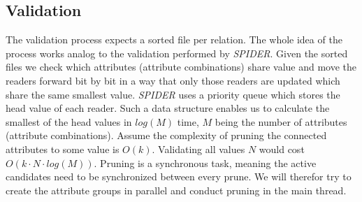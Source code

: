\subsection{Validation}\label{sec:spind_val}
The validation process expects a sorted file per relation. The whole idea of the process works analog to the validation performed by \textit{SPIDER}. Given the sorted files we check which attributes (attribute combinations) share value and move the readers forward bit by bit in a way that only those readers are updated which share the same smallest value. \textit{SPIDER} uses a priority queue which stores the head value of each reader. Such a data structure enables us to calculate the smallest of the head values in $log(M)$ time, $M$ being the number of attributes (attribute combinations). Assume the complexity of pruning the connected attributes to some value is $O(k)$. Validating all values $N$ would cost $O(k \cdot N \cdot log(M))$. Pruning is a synchronous task, meaning the active candidates need to be synchronized between every prune. We will therefor try to create the attribute groups in parallel and conduct pruning in the main thread.

